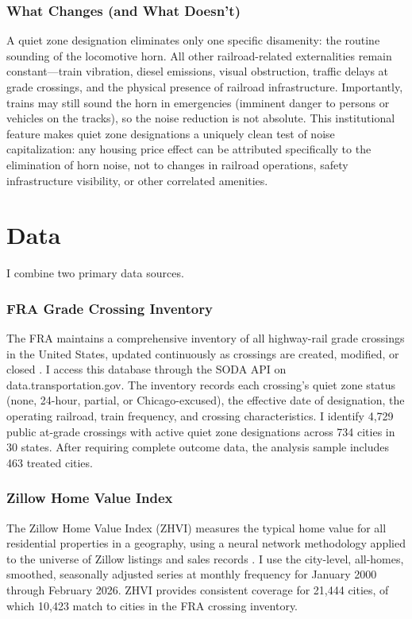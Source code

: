 \documentclass[12pt]{article}
\begin{document}
\subsubsection*{What Changes (and What Doesn't)} A quiet zone designation eliminates only one specific disamenity: the routine sounding of the locomotive horn. All other railroad-related externalities remain constant---train vibration, diesel emissions, visual obstruction, traffic delays at grade crossings, and the physical presence of railroad infrastructure. Importantly, trains may still sound the horn in emergencies (imminent danger to persons or vehicles on the tracks), so the noise reduction is not absolute. This institutional feature makes quiet zone designations a uniquely clean test of noise capitalization: any housing price effect can be attributed specifically to the elimination of horn noise, not to changes in railroad operations, safety infrastructure visibility, or other correlated amenities.


\section{Data}

I combine two primary data sources.

\subsubsection*{FRA Grade Crossing Inventory} The FRA maintains a comprehensive inventory of all highway-rail grade crossings in the United States, updated continuously as crossings are created, modified, or closed \citep{fra2024crossing}. I access this database through the SODA API on data.transportation.gov. The inventory records each crossing's quiet zone status (none, 24-hour, partial, or Chicago-excused), the effective date of designation, the operating railroad, train frequency, and crossing characteristics. I identify 4,729 public at-grade crossings with active quiet zone designations across 734 cities in 30 states. After requiring complete outcome data, the analysis sample includes 463 treated cities.

\subsubsection*{Zillow Home Value Index} The Zillow Home Value Index (ZHVI) measures the typical home value for all residential properties in a geography, using a neural network methodology applied to the universe of Zillow listings and sales records \citep{zillow2024data}. I use the city-level, all-homes, smoothed, seasonally adjusted series at monthly frequency for January 2000 through February 2026. ZHVI provides consistent coverage for 21,444 cities, of which 10,423 match to cities in the FRA crossing inventory.
\end{document}
